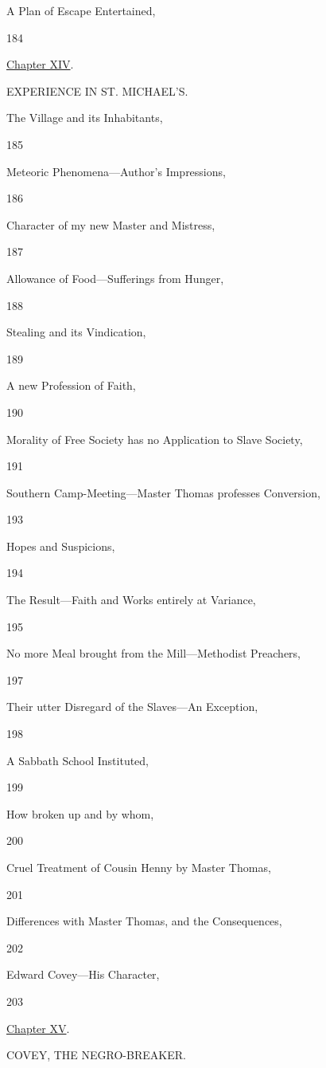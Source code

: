 A Plan of Escape Entertained,

184

\href{/wiki/My_Bondage_and_My_Freedom_(1855)/Chapter_XIV}{Chapter XIV}.

EXPERIENCE IN ST. MICHAEL'S.

The Village and its Inhabitants,

185

Meteoric Phenomena---Author's Impressions,

186

Character of my new Master and Mistress,

187

Allowance of Food---Sufferings from Hunger,

188

Stealing and its Vindication,

189

A new Profession of Faith,

190

Morality of Free Society has no Application to Slave Society,

191

Southern Camp-Meeting---Master Thomas professes Conversion,

193

Hopes and Suspicions,

194

The Result---Faith and Works entirely at Variance,

195

No more Meal brought from the Mill---Methodist Preachers,

197

Their utter Disregard of the Slaves---An Exception,

198

A Sabbath School Instituted,

199

How broken up and by whom,

200

Cruel Treatment of Cousin Henny by Master Thomas,

201

Differences with Master Thomas, and the Consequences,

202

Edward Covey---His Character,

203

\href{/wiki/My_Bondage_and_My_Freedom_(1855)/Chapter_XV}{Chapter XV}.

COVEY, THE NEGRO-BREAKER.


